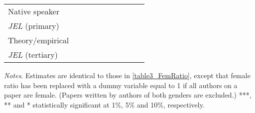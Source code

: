 \begin{table}[H]
\begin{threeparttable}
\begin{tabular}{p{2cm}S@{}S@{}S@{}S@{}S@{}S@{}S@{}S@{}S@{}}
            Native speaker                &               &               &               &               &           {}   &           {}   &           {}   &           {}   &           {}   \\
            \textit{JEL} (primary)        &               &               &               &               &               &               &           {}   &               &               \\
            Theory/empirical              &               &               &               &               &               &               &               &           {}   &               \\
            \textit{JEL} (tertiary)       &               &               &               &               &               &               &               &               &           {}   \\
            \bottomrule
        \end{tabular}
        \begin{tablenotes}
            \tiny
            \item \textit{Notes}. Estimates are identical to those in \autoref{table3_FemRatio}, except that female ratio has been replaced with a dummy variable equal to 1 if all authors on a paper are female. (Papers written by authors of both genders are excluded.) ***, ** and * statistically significant at 1\%, 5\% and 10\%, respectively.
        \end{tablenotes}
    \end{threeparttable}
\end{table}